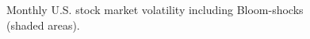\documentclass[a4paper,12pt,oneside,pointednumbers,bibtotoc,bigheadings,liststotoc]{scrbook}
\begin{document}
\begin{figure}[h]
   \centering
   \setlength\fboxsep{0pt}
   \setlength\fboxrule{0pt}
      \caption[Monthly U.S. stock market volatility including Bloom-shocks (shaded areas).]{Monthly U.S. stock market volatility including Bloom-shocks (shaded areas).}   \label{fig:volatility_cycle_shocks2}
\end{figure}
\end{document}
